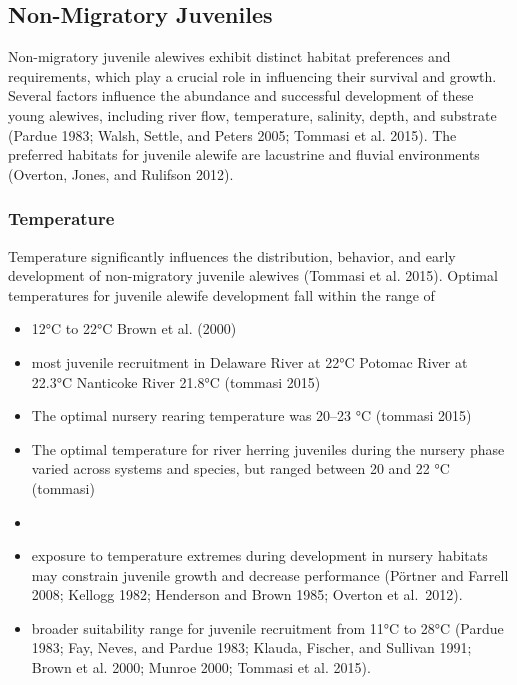 \documentclass[
]{book}
\begin{document}
\hypertarget{non-migratory-juveniles}{%
\subsection{Non-Migratory Juveniles}\label{non-migratory-juveniles}}

Non-migratory juvenile alewives exhibit distinct habitat preferences and requirements, which play a crucial role in influencing their survival and growth.
Several factors influence the abundance and successful development of these young alewives, including river flow, temperature, salinity, depth, and substrate (Pardue 1983; Walsh, Settle, and Peters 2005; Tommasi et al. 2015).
The preferred habitats for juvenile alewife are lacustrine and fluvial environments (Overton, Jones, and Rulifson 2012).

\hypertarget{temperature-1}{%
\subsubsection{Temperature}\label{temperature-1}}

Temperature significantly influences the distribution, behavior, and early development of non-migratory juvenile alewives (Tommasi et al. 2015).
Optimal temperatures for juvenile alewife development fall within the range of

\begin{itemize}
\item
  12°C to 22°C Brown et al. (2000)
\item
  most juvenile recruitment in Delaware River at 22°C Potomac River at 22.3°C Nanticoke River 21.8°C (tommasi 2015)
\item
  The optimal nursery rearing temperature was 20--23 °C (tommasi 2015)
\item
  The optimal temperature for river herring juveniles during the nursery phase varied across systems and species, but ranged between 20 and 22 °C (tommasi)
\item
\item
  exposure to temperature extremes during development in nursery habitats may constrain juvenile growth and decrease performance (Pörtner and Farrell 2008; Kellogg 1982; Henderson and Brown 1985; Overton et al.~2012).
\item
  broader suitability range for juvenile recruitment from 11°C to 28°C (Pardue 1983; Fay, Neves, and Pardue 1983; Klauda, Fischer, and Sullivan 1991; Brown et al. 2000; Munroe 2000; Tommasi et al. 2015).
\end{itemize}
\end{document}

